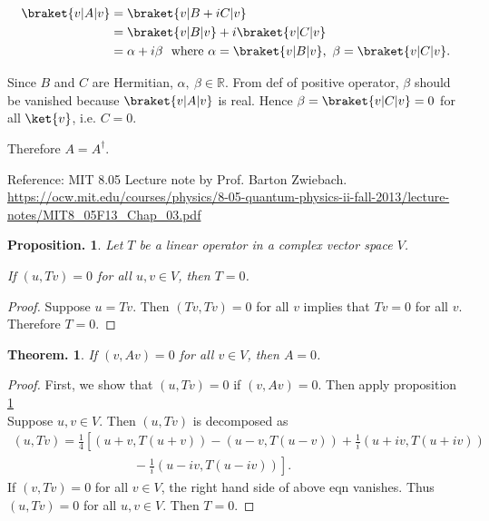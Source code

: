 \documentclass[10pt]{book}
\newtheorem{thm}{Theorem.}[section]
\newtheorem{prop}{Proposition.}[section]
\begin{document}
	\begin{equation}
\begin{aligned}
		\braket{v | A | v}  &= \braket{v | B + iC | v}\\
		&= \braket{v | B | v}  + i \braket{v | C | v}\\
		&= \alpha + i \beta ~~ \text{where } \alpha = \braket{v | B | v}, ~\beta = \braket{v | C | v}.
	\end{aligned}
\end{equation}
	
	Since $B$ and $C$ are Hermitian, $\alpha,~ \beta \in \mathds{R}$.
	From def of positive operator, $\beta$ should be vanished because $\braket{v | A | v}$ is real.
	Hence $\beta = \braket{v | C | v} =  0$ for all $\ket{v}$, i.e. $C = 0$.
	
	Therefore $A = A^\dagger$.
	

		Reference: MIT 8.05 Lecture note  by Prof. Barton Zwiebach.\\
		\url{https://ocw.mit.edu/courses/physics/8-05-quantum-physics-ii-fall-2013/lecture-notes/MIT8_05F13_Chap_03.pdf}
		
		\begin{prop} \label{prop: zeroop}
			Let $T$ be a linear operator in a complex vector space $V$.
			
			If $(u, Tv) = 0$ for all $u, v \in V$, then $T = 0$.
		\end{prop}
		
		\begin{proof}
			Suppose $u = Tv$. Then $(Tv, Tv) = 0$ for all $v$ implies that $Tv = 0$ for all $v$. Therefore $T = 0$.
		\end{proof}
		
		\begin{thm}
			If $(v, Av) = 0$ for all $v \in V$, then $A = 0$. \label{thm:zerooperator}
		\end{thm}
		
		\begin{proof}
			First, we show that $(u, Tv) = 0$ if $(v, Av) = 0$. Then apply proposition \ref{prop: zeroop}\\
			Suppose $u, v \in V$. Then $(u, Tv)$ is decomposed as
			\begin{equation}
\begin{aligned}
				(u, Tv) = \frac{1}{4} \left[ (u+v, T(u+v)) - (u-v, T(u-v)) + \frac{1}{i} (u+iv, T(u+iv)) \right.\\
				\left. \hspace{4cm} - \frac{1}{i} (u-iv, T(u-iv))  \right].
			\end{aligned}
\end{equation}
			If $(v, Tv) = 0$ for all $v \in V$, the right hand side of above eqn vanishes. Thus $(u, Tv) = 0$ for all $u, v \in V$.
			Then $T = 0$.
		\end{proof}
		
\end{document}
